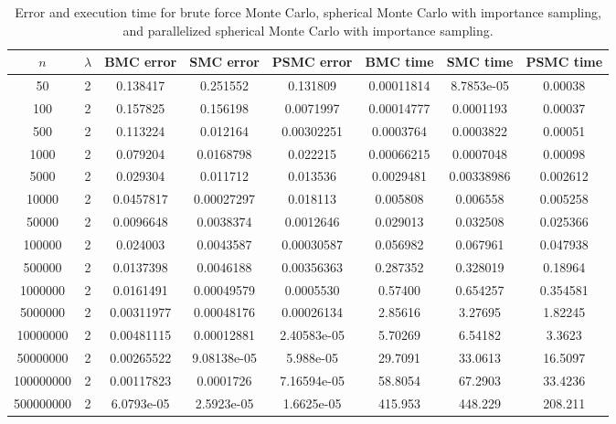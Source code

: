 \documentclass{article}
\begin{document}
  \begin{table}[ht]
    \centering
    \caption{Error and execution time for brute force Monte Carlo, spherical Monte Carlo with importance sampling, and parallelized spherical Monte Carlo with importance sampling.}
    \vspace{2mm}
    \label{tab:error-montecarlo}
    \begin{tabular}{|c|c|c|c|c|c|c|c|}
        \hline
        $n$ & $\lambda$ & BMC error & SMC error & PSMC error & BMC time & SMC time & PSMC time  \\
        \hline \hline
        50 & 2 & 0.138417 & 0.251552 & 0.131809 & 0.00011814 & 8.7853e-05 & 0.00038 \\
        100 & 2 & 0.157825 & 0.156198 & 0.0071997 & 0.00014777 & 0.0001193 & 0.00037 \\
        500 & 2 & 0.113224 & 0.012164 & 0.00302251 & 0.0003764 & 0.0003822 & 0.00051 \\
        1000 & 2 & 0.079204 & 0.0168798 & 0.022215 & 0.00066215 & 0.0007048 & 0.00098 \\
        5000 & 2 & 0.029304 & 0.011712 & 0.013536 & 0.0029481 & 0.00338986 & 0.002612 \\
        10000 & 2 & 0.0457817 & 0.00027297 & 0.018113 & 0.005808 & 0.006558 & 0.005258 \\
        50000 & 2 & 0.0096648 & 0.0038374 & 0.0012646 & 0.029013 & 0.032508 & 0.025366 \\
        100000 & 2 & 0.024003 & 0.0043587 & 0.00030587 & 0.056982 & 0.067961 & 0.047938 \\
        500000 & 2 & 0.0137398 & 0.0046188 & 0.00356363 & 0.287352 & 0.328019 & 0.18964 \\
        1000000 & 2 & 0.0161491 & 0.00049579 & 0.0005530 & 0.57400 & 0.654257 & 0.354581 \\
        5000000 & 2 & 0.00311977 & 0.00048176 & 0.00026134 & 2.85616 & 3.27695 & 1.82245 \\
        10000000 & 2 & 0.00481115 & 0.00012881 & 2.40583e-05 & 5.70269 & 6.54182 & 3.3623 \\
        50000000 & 2 & 0.00265522 & 9.08138e-05 & 5.988e-05 & 29.7091 & 33.0613 & 16.5097 \\
        100000000 & 2 & 0.00117823 & 0.0001726 & 7.16594e-05 & 58.8054 & 67.2903 & 33.4236 \\
        500000000 & 2 & 6.0793e-05 & 2.5923e-05 & 1.6625e-05 & 415.953 & 448.229 & 208.211 \\
        \hline
    \end{tabular} \\
    \hspace{0pt}\\
  \end{table}
\end{document}
